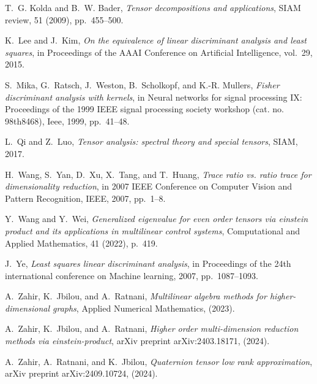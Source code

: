 \documentclass{siamltex}
\begin{document}
\begin{thebibliography}{10}
{\sc T.~G. Kolda and B.~W. Bader}, {\em Tensor decompositions and
    applications}, SIAM review, 51 (2009), pp.~455--500.

{\sc K.~Lee and J.~Kim}, {\em On the equivalence of linear discriminant
    analysis and least squares}, in Proceedings of the AAAI Conference on
    Artificial Intelligence, vol.~29, 2015.

{\sc S.~Mika, G.~Ratsch, J.~Weston, B.~Scholkopf, and K.-R. Mullers}, {\em
    Fisher discriminant analysis with kernels}, in Neural networks for signal
    processing IX: Proceedings of the 1999 IEEE signal processing society
    workshop (cat. no. 98th8468), Ieee, 1999, pp.~41--48.

{\sc L.~Qi and Z.~Luo}, {\em Tensor analysis: spectral theory and special
    tensors}, SIAM, 2017.

{\sc H.~Wang, S.~Yan, D.~Xu, X.~Tang, and T.~Huang}, {\em Trace ratio vs. ratio
    trace for dimensionality reduction}, in 2007 IEEE Conference on Computer
    Vision and Pattern Recognition, IEEE, 2007, pp.~1--8.

{\sc Y.~Wang and Y.~Wei}, {\em Generalized eigenvalue for even order tensors
    via einstein product and its applications in multilinear control systems},
    Computational and Applied Mathematics, 41 (2022), p.~419.

{\sc J.~Ye}, {\em Least squares linear discriminant analysis}, in Proceedings
    of the 24th international conference on Machine learning, 2007,
    pp.~1087--1093.

{\sc A.~Zahir, K.~Jbilou, and A.~Ratnani}, {\em Multilinear algebra methods for
    higher-dimensional graphs}, Applied Numerical Mathematics,  (2023).

{\sc A.~Zahir, K.~Jbilou, and A.~Ratnani}, {\em Higher order
    multi-dimension reduction methods via einstein-product}, arXiv preprint
    arXiv:2403.18171,  (2024).

{\sc A.~Zahir, A.~Ratnani, and K.~Jbilou}, {\em Quaternion tensor low rank
    approximation}, arXiv preprint arXiv:2409.10724,  (2024).

\end{thebibliography}
\end{document}
